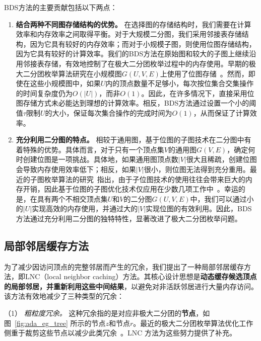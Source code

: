   BDS方法的主要贡献包括以下两点：


  \begin{enumerate}
    \item \textbf{结合两种不同图存储结构的优势。} 在选择图的存储结构时，我们需要在计算效率和内存效率之间取得平衡。对于大规模二分图，我们采用邻接表存储结构，因为它具有较好的内存效率；而对于小规模子图，则使用位图存储结构，因为它具有较好的计算效率。我们的BDS方法在原始图和较大的子图上继续沿用邻接表存储，有效地控制了在极大二分团枚举过程中的内存使用。早期的极大二分团枚举算法研究在小规模图$G(U, V, E)$上使用了位图存储~\cite{lcmmbc07,iMBEA14}。然而，即使在这些小规模图中，如果$U$内的顶点数量不足够小，每次按位集合交集操作的时间复杂度仍为$O(|U|)$，而非$O(1)$。因此，在许多情况下，直接采用位图存储方式未必能达到理想的计算效率。相反，BDS方法通过设置一个小的阈值$\tau$限制$U$的大小，保证每次集合操作的完成时间为$O(1)$，从而保证了计算效率。
    
    \item \textbf{充分利用二分图的特点。} 相较于通用图，基于位图的子图技术在二分图中有着特殊的优势。具体而言，对于只有一个顶点集$V$的通用图$G(V,E)$，确定何时创建位图是一项挑战。具体地，如果通用图顶点数$|V|$很大且稀疏，创建位图会导致内存使用效率低下；相反，如果$|V|$很小，则位图无法得到充分重用。最近的子图枚举算法的研究~\cite{Graphset23}指出，由于子位图技术的使用往往会带来巨大的内存开销，因此基于位图的子图优化技术仅应用在少数几项工作中~\cite{Sandslash21,Kclique22,g2miner22}。幸运的是，在具有两个不相交顶点集$U$和$V$的二分图$G(U,V,E)$中，我们可以通过小的$|U|$实现高效的内存使用，并通过大的$|V|$实现位图的有效利用。因此，BDS方法通过充分利用二分图的独特特性，显著改进了极大二分团枚举问题。
  
\end{enumerate}

\subsection{局部邻居缓存方法}
\label{subsec:ada_design_2}


为了减少因访问顶点的完整邻居而产生的冗余，我们提出了一种局部邻居缓存方法，即LNC（local neighbor caching）方法。其核心设计思想是\textbf{动态缓存候选顶点的局部邻居，并重新利用这些中间结果}，以避免对非活跃邻居进行大量内存访问。该方法有效地减少了三种类型的冗余：

（1） \emph{\textit{粗粒度冗余。}}
这种冗余指的是对应非极大二分团的\textbf{节点}，如图~\ref{fig:ada_eg_tree} 所示的节点$z$和节点$r$。最近的极大二分团枚举算法优化工作侧重于裁剪这些节点以减少此类冗余~\cite{iMBEA14,PMBE20,ooMBE22}。LNC 方法为这些努力提供了补充。

